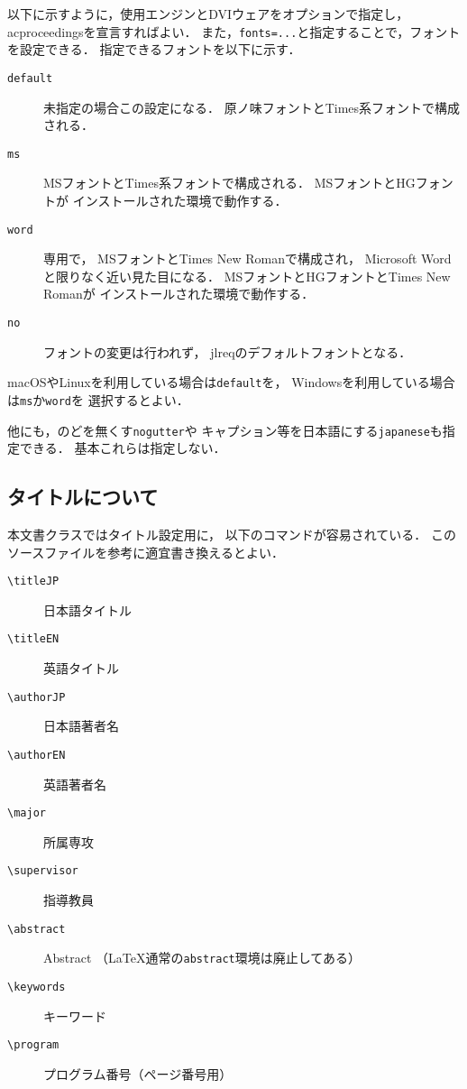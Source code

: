 \documentclass[uplatex, dvipdfmx, fonts=default]{acproceedings}
\begin{document}
以下に示すように，使用エンジンとDVIウェアをオプションで指定し，
\textsf{acproceedings}を宣言すればよい．
また，\texttt{fonts=...}と指定することで，フォントを設定できる．
指定できるフォントを以下に示す．
\begin{description}
	\item[\texttt{default}]
	未指定の場合この設定になる．
	原ノ味フォントとTimes系フォントで構成される．
	\item[\texttt{ms}]
	MSフォントとTimes系フォントで構成される．
	MSフォントとHGフォントが
	インストールされた環境で動作する．
	\item[\texttt{word}]
	{\LuaLaTeX}専用で，
	MSフォントとTimes New Romanで構成され，
	Microsoft Wordと限りなく近い見た目になる．
	MSフォントとHGフォントとTimes New Romanが
	インストールされた環境で動作する．
	\item[\texttt{no}]
	フォントの変更は行われず，
	\textsf{jlreq}のデフォルトフォントとなる．
\end{description}
macOSやLinuxを利用している場合は\texttt{default}を，
Windowsを利用している場合は\texttt{ms}か\texttt{word}を
選択するとよい．

他にも，のどを無くす\texttt{nogutter}や
キャプション等を日本語にする\texttt{japanese}も指定できる．
基本これらは指定しない．

\subsection{タイトルについて}

本文書クラスではタイトル設定用に，
以下のコマンドが容易されている．
このソースファイルを参考に適宜書き換えるとよい．
\begin{description}
	\item[\texttt{\textbackslash{}titleJP}]    日本語タイトル
	\item[\texttt{\textbackslash{}titleEN}]    英語タイトル
	\item[\texttt{\textbackslash{}authorJP}]   日本語著者名
	\item[\texttt{\textbackslash{}authorEN}]   英語著者名
	\item[\texttt{\textbackslash{}major}]      所属専攻
	\item[\texttt{\textbackslash{}supervisor}] 指導教員
	\item[\texttt{\textbackslash{}abstract}]   Abstract
	（{\LaTeX}通常の\texttt{abstract}環境は廃止してある）
	\item[\texttt{\textbackslash{}keywords}]   キーワード
	\item[\texttt{\textbackslash{}program}]    プログラム番号（ページ番号用）
\end{description}
\end{document}

